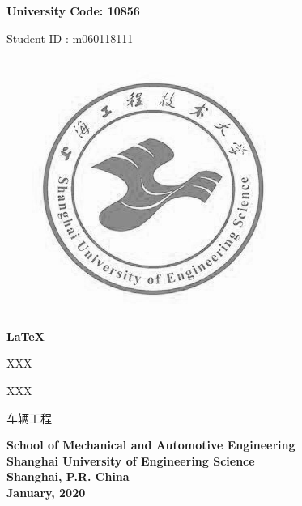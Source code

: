 

\newpage

    {\noindent \songti\sihao\bfseries
            \hspace{18em} University Code: 10856
    
            \hspace{17em} Student \quad ID : m060118111
    }
    
    \begin{center}
            \includegraphics[scale=0.4]{images/logo}
    \end{center}
    
    \begin{center}\songti\yihao\bfseries
            \LaTeX
    \end{center}
    
    \vspace{4cm}
    \begin{description}[
                    labelindent=4.5cm,
                    topsep=1cm,
                    format=\sanhao
            ]\songti\sanhao
            \item[Candidate:] XXX
            \item[Supervisor:] XXX
            \item[\qquad Major:] 车辆工程
    \end{description}
    
    \vspace{1cm}
    \begin{center}\sanhao\textbf{
        School of Mechanical and Automotive Engineering \\
        Shanghai University of Engineering Science \\
        Shanghai, P.R. China \\
        January, 2020
    }
    \end{center}
